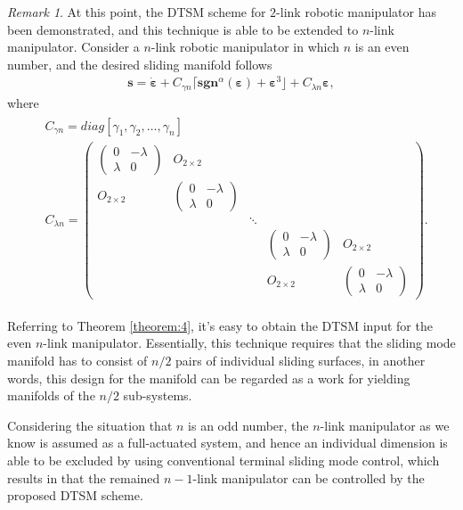 \documentclass[3p]{elsarticle}
\theoremstyle{plain}
\theoremstyle{remark}
\newtheorem{myrem}{Remark}
\begin{document}
\begin{myrem}
At this point, the DTSM scheme for $2$-link robotic manipulator has been demonstrated, and this technique is able to be extended to $n$-link manipulator. Consider a $n$-link robotic manipulator in which $n$ is an even number, and the desired sliding manifold follows
\begin{align}
\bm s = \dot{\bm \varepsilon}+C_{\gamma n}\lceil\bm{sgn}^\alpha(\bm \varepsilon)+\bm\varepsilon^3\rfloor+C_{\lambda n}{\bm\varepsilon},
\end{align}
where
\begin{align}
\begin{split}
&C_{\gamma n}=diag[\gamma_1,\gamma_2,\ldots,\gamma_n]\\
&C_{\lambda n}=
\begin{pmatrix}
\begin{pmatrix}
0 &-\lambda\\ \lambda &0
\end{pmatrix} &O_{2\times 2} & & &\\
O_{2\times 2} &\begin{pmatrix}
0 &-\lambda\\ \lambda &0
\end{pmatrix} & & &\\
& &\ddots & &\\
& & &\begin{pmatrix}
0 &-\lambda\\ \lambda &0
\end{pmatrix} &O_{2\times 2}\\
& & &O_{2\times 2} &\begin{pmatrix}
0 &-\lambda\\ \lambda &0
\end{pmatrix}
\end{pmatrix}.
\end{split}
\end{align}\par
Referring to Theorem \ref{theorem:4}, it's easy to obtain the DTSM input for the even $n$-link manipulator. Essentially, this technique requires that the sliding mode manifold has to consist of $n/2$ pairs of individual sliding surfaces, in another words, this design for the manifold can be regarded as a work for yielding manifolds of the $n/2$ sub-systems.\par
Considering the situation that $n$ is an odd number, the $n$-link manipulator as we know is assumed as a full-actuated system, and hence an individual dimension is able to be excluded by using conventional terminal sliding mode control, which results in that the remained $n-1$-link manipulator can be controlled by the proposed DTSM scheme.
\end{myrem}
\end{document}
